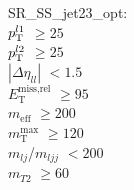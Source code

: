 SR\_SS\_jet23\_opt: \\
$p_{\text{T}}^{l1}$ $\geq 25$ \\
$p_{\text{T}}^{l2}$ $\geq 25$ \\
$|\Delta\eta_{ll}|$ $<1.5$ \\
$E_{\text{T}}^{\text{miss,rel}}$ $\geq 95$ \\
$m_{\text{eff}}$ $\geq 200$ \\
$m_{\text{T}}^{\text{max}}$ $\geq 120$ \\
$m_{lj}$/$m_{ljj}$ $<200$ \\
$m_{T2}$ $\geq 60$ \\
